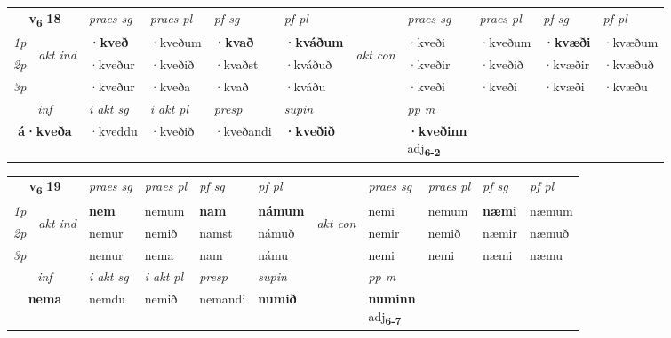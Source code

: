 \noindent
\begin{tabular}{lllllllllll} \toprule
\multicolumn{2}{c}{\textbf{v{\textsubscript{6}}} \Large{\textbf{18}}}  &  \textit{praes sg}  & \textit{praes pl}  &\textit{ pf sg} & \textit{pf pl} &  &  \textit{praes sg}  & \textit{praes pl}  & \textit{pf sg} & \textit{pf pl } \\*
	\cmidrule{3-6} \cmidrule{8-11}
 {\textit{1p}} & \multirow{3}{*}{\begin{turn}{90}\textit{akt ind}\end{turn}} & \textbf{·kveð} & ·kveðum & \textbf{·kvað} & \textbf{·kváðum} & \multirow{3}{*}{\begin{turn}{90}\textit{akt con}\end{turn}} &·kveði & ·kveðum & \textbf{·kvæði} & ·kvæðum\\*
 {\textit{2p}} &  &  ·kveður  & ·kveðið & ·kvaðst & ·kváðuð & & ·kveðir & ·kveðið & ·kvæðir & ·kvæðuð \\*
{\textit{3p}} &  & ·kveður & ·kveða & ·kvað & ·kváðu & & ·kveði & ·kveði& ·kvæði & ·kvæðu \\*
\cmidrule{3-6} \cmidrule{8-11}

   \multicolumn{2}{c}{\textit{inf}}  & \textit{i akt sg} & \textit{i akt pl}   & \textit{presp} & \textit{supin}  && \textit{pp m} \\*
  \multicolumn{2}{c}{\textbf{á\allowbreak ·kveða}} & ·kveddu  & ·kveðið   & ·kveðandi &  \textbf{·kveðið}  && \specialcell{\textbf{·kveðinn} \\ adj\textbf{\textsubscript{6-2}}} \\*
\end{tabular}

\noindent
\begin{tabular}{lllllllllll} \toprule
\multicolumn{2}{c}{\textbf{v{\textsubscript{6}}} \Large{\textbf{19}}}  &  \textit{praes sg}  & \textit{praes pl}  &\textit{ pf sg} & \textit{pf pl} &  &  \textit{praes sg}  & \textit{praes pl}  & \textit{pf sg} & \textit{pf pl } \\*
	\cmidrule{3-6} \cmidrule{8-11}
 {\textit{1p}} & \multirow{3}{*}{\begin{turn}{90}\textit{akt ind}\end{turn}} & \textbf{nem} & nemum & \textbf{nam} & \textbf{námum} & \multirow{3}{*}{\begin{turn}{90}\textit{akt con}\end{turn}} &nemi & nemum & \textbf{næmi} & næmum\\*
 {\textit{2p}} &  &  nemur  & nemið & namst & námuð & & nemir & nemið & næmir & næmuð \\*
{\textit{3p}} &  & nemur & nema & nam & námu & & nemi & nemi& næmi & næmu \\*
\cmidrule{3-6} \cmidrule{8-11}

   \multicolumn{2}{c}{\textit{inf}}  & \textit{i akt sg} & \textit{i akt pl}   & \textit{presp} & \textit{supin}  && \textit{pp m} \\*
  \multicolumn{2}{c}{\textbf{nema}} & nemdu  & nemið   & nemandi &  \textbf{numið}  && \specialcell{\textbf{numinn} \\ adj\textbf{\textsubscript{6-7}}} \\*
\end{tabular}

